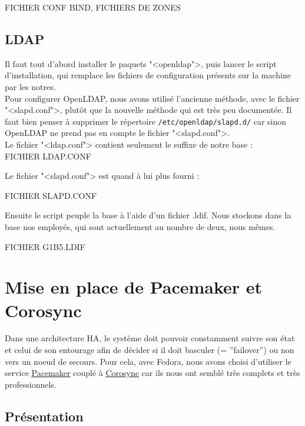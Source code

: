 \documentclass[11pt,a4paper]{report}
\begin{document}
		    FICHIER CONF BIND, FICHIERS DE ZONES

            \subsection{LDAP}

                    Il faut tout d'abord installer le paquets "<openldap">, puis lancer le script d'installation, qui remplace les fichiers de configuration pr\'esents 
sur la machine par les notres.\\

                    Pour configurer OpenLDAP, nous avons utilis\'e l'ancienne m\'ethode, avec le fichier "<slapd.conf">, plut\^ot que la nouvelle m\'ethode qui est 
tr\`es peu document\'ee. Il faut bien penser \`a supprimer le r\'epertoire \verb+/etc/openldap/slapd.d/+ car sinon OpenLDAP ne prend pas en compte le fichier "<slapd.conf">.\\

                    Le fichier "<ldap.conf"> contient seulement le suffixe de notre base :\\

                    FICHIER LDAP.CONF

                    Le fichier "<slapd.conf"> est quand \`a lui plus fourni :

                    FICHIER SLAPD.CONF

                    Ensuite le script peuple la base \`a l'aide d'un fichier .ldif. Nous stockons dans la base nos employ\'es, qui sont actuellement au nombre de deux, nous m\^emes.

                    FICHIER G1B5.LDIF

        \section{Mise en place de Pacemaker et Corosync}
            
            Dans une architecture HA, le système doit pouvoir constamment suivre son état et celui de son entourage afin de décider si il doit basculer (= ''failover'') ou non vers un noeud de secours. Pour cela, avec Fedora, nous avons choisi d'utiliser le service \underline{\href{http://clusterlabs.org}{Pacemaker}} couplé à \underline{\href{http://www.corosync.org}{Corosync}} car ils nous ont semblé très complets et très professionnels.
            
            \subsection{Présentation}
                
\end{document}
